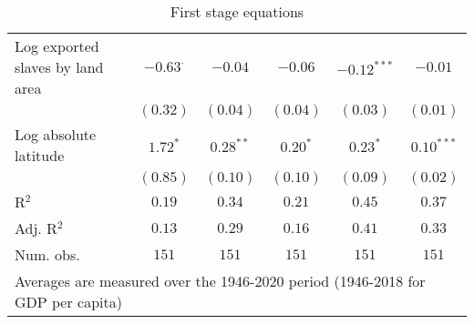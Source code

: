 \begin{sidewaystable}[H]
\begin{center}
{\begin{tabular}{l c c c c c}
Log exported slaves by land area & $-0.63^{\cdot}$ & $-0.04$        & $-0.06$      & $-0.12^{***}$   & $-0.01$         \\
                                 & $(0.32)$        & $(0.04)$       & $(0.04)$     & $(0.03)$        & $(0.01)$        \\
Log absolute latitude            & $1.72^{*}$      & $0.28^{**}$    & $0.20^{*}$   & $0.23^{*}$      & $0.10^{***}$    \\
                                 & $(0.85)$        & $(0.10)$       & $(0.10)$     & $(0.09)$        & $(0.02)$        \\
\hline
R$^2$                            & $0.19$          & $0.34$         & $0.21$       & $0.45$          & $0.37$          \\
Adj. R$^2$                       & $0.13$          & $0.29$         & $0.16$       & $0.41$          & $0.33$          \\
Num. obs.                        & $151$           & $151$          & $151$        & $151$           & $151$           \\
\hline
\multicolumn{6}{l}{\scriptsize{Averages are measured over the 1946-2020 period (1946-2018 for GDP per capita)}}
\end{tabular}
}
\caption{First stage equations}
\label{MediationTableRob}
\end{center}
\end{sidewaystable}

